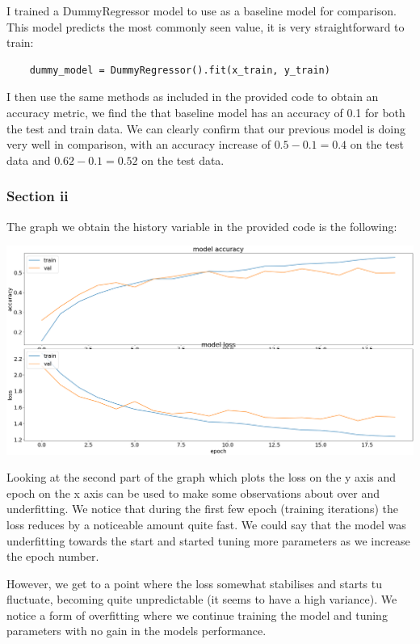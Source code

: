 \documentclass[10pt]{article}
\begin{document}
I trained a DummyRegressor model to use as a baseline model for comparison.
This model predicts the most commonly seen value, it is very
straightforward to train:
\begin{lstlisting}
    dummy_model = DummyRegressor().fit(x_train, y_train)
\end{lstlisting}

I then use the same methods as included in the provided code to
obtain an accuracy metric, we find the that baseline model
has an accuracy of 0.1 for both the test and train data. We can 
clearly confirm that our previous model is doing very well in comparison, with an accuracy increase of
$0.5 - 0.1 = 0.4$ on the test data and $0.62 - 0.1 = 0.52$ on the test data.

\subsubsection*{Section ii}
The graph we obtain the history variable in the provided code is the following:

\begin{center}
    \includegraphics[scale=0.3]{default_5k.png}
\end{center}

Looking at the second part of the graph which plots the loss on the y axis and epoch on the x axis
can be used to make some observations about over and underfitting.
We notice that during the first few epoch (training iterations)
the loss reduces by a noticeable amount quite fast. We could say that
the model was underfitting towards the start and started tuning more
parameters as we increase the epoch number.

However, we get to a point where the loss somewhat stabilises and starts tu fluctuate, becoming
quite unpredictable (it seems to have a high variance). We notice a form of overfitting
where we continue training the model and tuning parameters with no gain in the models performance.
\end{document}
